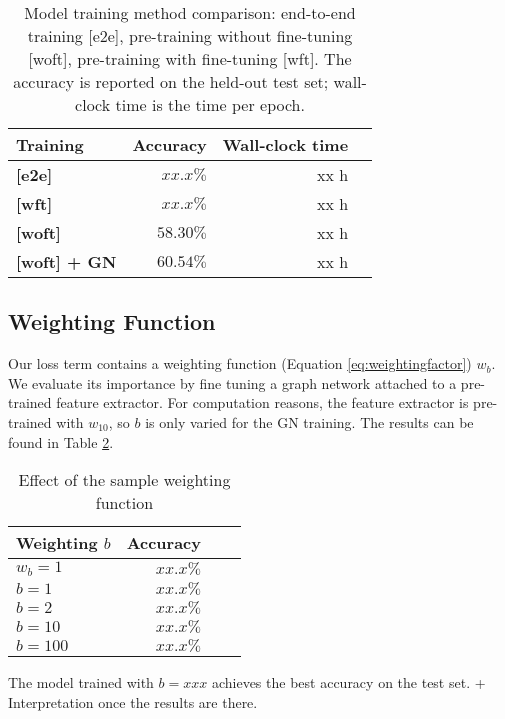 \begin{table}
    \centering
    \begin{tabular}{lrrr}
        \textbf{Training} & \textbf{Accuracy} & \textbf{Wall-clock time}\\\hline
        \textbf{[e2e]} & $xx.x\%$ & xx h\\
        \textbf{[wft]} & $xx.x\%$ & xx h\\
        \textbf{[woft]} & $58.30\%$ & xx h\\
        \textbf{[woft] + GN} & $60.54\%$ & xx h\\
    \end{tabular}
    \caption[Model training method comparison]{Model training method comparison: end-to-end training [e2e], pre-training without fine-tuning [woft], pre-training with fine-tuning [wft]. The accuracy is reported on the held-out test set; wall-clock time is the time per epoch.}
    \label{tab:trainmethodcomparison}
\end{table}

\subsection{Weighting Function}

Our loss term contains a weighting function (Equation \ref{eq:weightingfactor}) $w_b$. We evaluate its importance by fine tuning a graph network attached to a pre-trained feature extractor. For computation reasons, the feature extractor is pre-trained with $w_{10}$, so $b$ is only varied for the GN training. The results can be found in Table \ref{tab:weightingbase}.

\begin{table}
    \centering
    \begin{tabular}{lrrr}
        \textbf{Weighting $b$} & \textbf{Accuracy}\\\hline
        $w_b=1$ & $xx.x\%$\\
        $b=1$ & $xx.x\%$\\
        $b=2$ & $xx.x\%$\\
        $b=10$ & $xx.x\%$\\
        $b=100$ & $xx.x\%$\\
    \end{tabular}
    \caption[Effect of the sample weighting function]{Effect of the sample weighting function}
    \label{tab:weightingbase}
\end{table}

The model trained with $b=xxx$ achieves the best accuracy on the test set. + Interpretation once the results are there.

